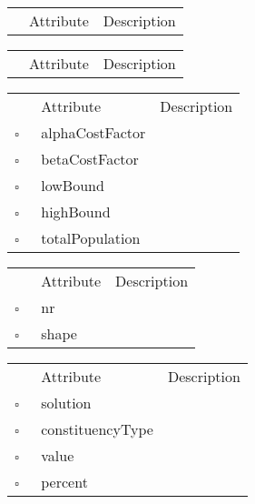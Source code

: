 \begin{table}
\caption{Nuts3  }

\begin{longtable}{llp{8cm}}
& Attribute & Description \\
\end{longtable}
\label{attr:Nuts3}
\end{table}

\begin{table}
\caption{Province  }

\begin{longtable}{llp{8cm}}
& Attribute & Description \\
\end{longtable}
\label{attr:Province}
\end{table}

\clearpage
\begin{table}
\caption{Scenario  This class describes the dataset for the application. Typically there is a single instance of this class in the application at all times.}

\begin{longtable}{llp{8cm}}
& Attribute & Description \\
$\square$\ & alphaCostFactor &  \\
$\square$\ & betaCostFactor &  \\
$\square$\ & lowBound &  \\
$\square$\ & highBound &  \\
$\square$\ & totalPopulation &  \\
\end{longtable}
\label{attr:Scenario}
\end{table}

\begin{table}
\caption{Shaped  }

\begin{longtable}{llp{8cm}}
& Attribute & Description \\
$\square$\ & nr &  \\
$\square$\ & shape &  \\
\end{longtable}
\label{attr:Shaped}
\end{table}

\begin{table}
\caption{SolConstType  }

\begin{longtable}{llp{8cm}}
& Attribute & Description \\
$\square$\ & solution &  \\
$\square$\ & constituencyType &  \\
$\square$\ & value &  \\
$\square$\ & percent &  \\
\end{longtable}
\label{attr:SolConstType}
\end{table}

